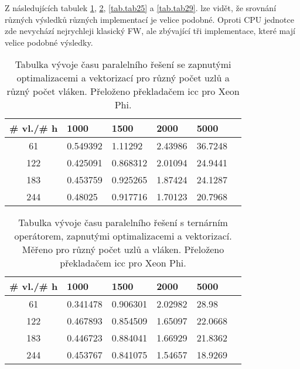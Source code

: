 \documentclass[a4paper,11pt]{article}
\begin{document}
  Z následujících tabulek \ref{tab.tab23},
  \ref{tab.tab24}, \ref{tab.tab25} a \ref{tab.tab29}. lze vidět, že srovnání různých výsledků různých implementací je velice podobné. 
 Oproti CPU jednotce zde nevychází nejrychleji klasický FW, ale zbývající tři implementace, které mají 
 velice podobné výsledky.
  \begin{table}[ht]
  \begin{center}
   \begin{tabular}{|c|l|l|l|l|l|}
    \hline 
    \# vl./\# h & 1000 & 1500 & 2000 & 5000 \\
   \hline 
   \hline 
   61 & 0.549392 & 1.11292 & 2.43986 & 36.7248 \\
   \hline
    122 & 0.425091 & 0.868312 & 2.01094 & 24.9441 \\
   \hline
    183 & 0.453759 & 0.925265 & 1.87424 & 24.1287 \\
   \hline
    244 & 0.48025 & 0.917716 & 1.70123 & 20.7968\\
   \hline        
    \end{tabular}
   \caption{Tabulka vývoje času paralelního řešení se zapnutými optimalizacemi a vektorizací pro různý počet uzlů a různý počet vláken. Přeloženo 
   překladačem icc pro Xeon Phi.} 
   \label{tab.tab23}
  \end{center}   
  \end{table}
  
    \begin{table}[ht]
  \begin{center}
   \begin{tabular}{|c|l|l|l|l|l|}
    \hline 
    \# vl./\# h & 1000 & 1500 & 2000 & 5000 \\
   \hline 
   \hline 
   61 & 0.341478 & 0.906301 & 2.02982 & 28.98 \\
   \hline
    122 & 0.467893 & 0.854509 & 1.65097 & 22.0668 \\
   \hline
    183 & 0.446723 & 0.884041 & 1.66929 & 21.8362 \\
   \hline
    244 & 0.453767 & 0.841075 & 1.54657 & 18.9269 \\
   \hline        
    \end{tabular}
   \caption{Tabulka vývoje času paralelního řešení s ternárním operátorem, zapnutými optimalizacemi a vektorizací. Měřeno pro různý počet uzlů a vláken. Přeloženo 
   překladačem icc pro Xeon Phi.} 
   \label{tab.tab24}
  \end{center}   
  \end{table}
  
\end{document}
